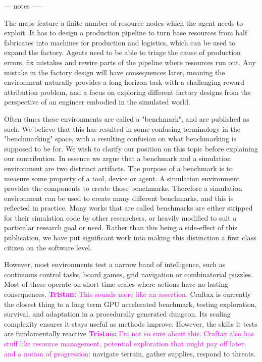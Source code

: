 \documentclass{article}
\newcommand{\tristan}[1]{\textcolor{magenta}{\textbf{Tristan:} #1}}
\begin{document}
--- notes -----

The maps feature a finite number of resource nodes which the agent needs to exploit. It has to design a production pipeline to turn base resources from half fabricates into machines for production and logistics, which can be used to expand the factory. Agents need to be able to triage the cause of production errors, fix mistakes and rewire parts of the pipeline where resources run out. Any mistake in the factory design will have consequences later, meaning the environment naturally provides a long horizon task with a challenging reward attribution problem, and a focus on exploring different factory designs from the perspective of an engineer embodied in the simulated world. 





Often times these environments are called a "benchmark", and are published as such.
We believe that this has resulted in some confusing terminology in the "benchmarking" space, with a resulting confusion on what benchmarking is supposed to be for. 
We wish to clarify our position on this topic before explaining our contribution.
In essence we argue that a benchmark and a simulation environment are two distrinct artifacts. 
The purpose of a benchmark is to measure some property of a tool, device or agent. 
A simulation environment provides the components to create those benchmarks. 
Therefore a simulation environment can be used to create many different benchmarks, and this is reflected in practice.
Many works that are called benchmarks are either stripped for their simulation code by other researchers, or heavily modified to suit a particular research goal or need. 
Rather than this being a side-effect of this publication, we have put significant work into making this distinction a first class citizen on the software level. 






However, most environments test a narrow band of intelligence, such as continuous control tasks, board games, grid navigation or combinatorial puzzles.
Most of these operate on short time scales where actions have no lasting consequences. \tristan{This sounds more like an assertion.}
Craftax is currently the closest thing to a long term GPU accelerated benchmark, testing exploration, survival, and adaptation in a procedurally generated dungeon.
Its scaling complexity ensures it stays useful as methods improve.
However, the skills it tests are fundamentally reactive \tristan{I'm not so sure about this. Craftax also has stuff like resource management, potential exploration that might pay off later, and a notion of progression}: navigate terrain, gather supplies, respond to threats.
\end{document}

